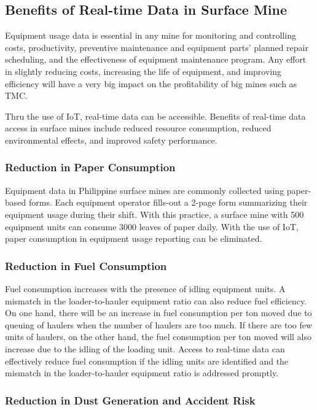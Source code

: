 \documentclass[12pt]{report}
\begin{document}
\subsection{Benefits of Real-time Data in Surface Mine}

Equipment usage data is essential in any mine for monitoring and controlling costs, productivity, preventive maintenance and equipment parts' planned repair scheduling, and the effectiveness of equipment maintenance program.
Any effort in slightly reducing costs, increasing the life of equipment, and improving efficiency will have a very big impact on the profitability of big mines such as TMC.

Thru the use of IoT, real-time data can be accessible.
Benefits of real-time data access in surface mines include reduced resource consumption, reduced environmental effects, and improved safety performance.

\subsubsection{Reduction in Paper Consumption}

Equipment data in Philippine surface mines are commonly collected using paper-based forms.
Each equipment operator fills-out a 2-page form summarizing their equipment usage during their shift.
With this practice, a surface mine with 500 equipment units can consume 3000 leaves of paper daily.
With the use of IoT, paper consumption in equipment usage reporting can be eliminated.

\subsubsection{Reduction in Fuel Consumption}

Fuel consumption increases with the presence of idling equipment units.
A mismatch in the loader-to-hauler equipment ratio can also reduce fuel efficiency.
On one hand, there will be an increase in fuel consumption per ton moved due to queuing of haulers when the number of haulers are too much.
If there are too few units of haulers, on the other hand, the fuel consumption per ton moved will also increase due to the idling of the loading unit.
Access to real-time data can effectively reduce fuel consumption if the idling units are identified and the mismatch in the loader-to-hauler equipment ratio is addressed promptly.

\subsubsection{Reduction in Dust Generation and Accident Risk}
\end{document}
